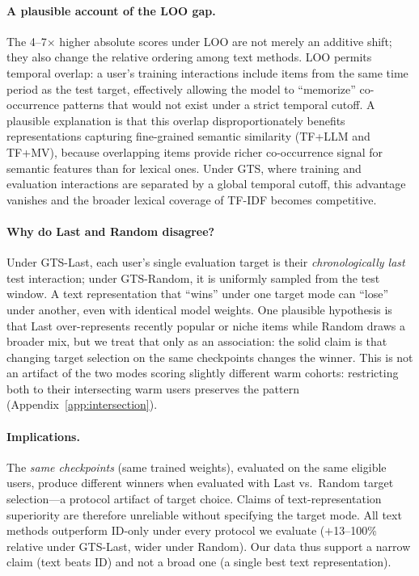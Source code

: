 \documentclass[sigconf,natbib=true,anonymous]{acmart}
\newcommand{\tfidf}{\textsc{TF-IDF}\xspace}
\newcommand{\tfllm}{\textsc{TF+LLM}\xspace}
\newcommand{\tfmv}{\textsc{TF+MV}\xspace}
\begin{document}
\paragraph{A plausible account of the LOO gap.}
The 4--7$\times$ higher absolute scores under LOO are not merely an additive shift; they also change the relative ordering among text methods.
LOO permits temporal overlap: a user's training interactions include items from the same time period as the test target, effectively allowing the model to ``memorize'' co-occurrence patterns that would not exist under a strict temporal cutoff.
A plausible explanation is that this overlap disproportionately benefits representations capturing fine-grained semantic similarity (\tfllm and \tfmv), because overlapping items provide richer co-occurrence signal for semantic features than for lexical ones.
Under GTS, where training and evaluation interactions are separated by a global temporal cutoff, this advantage vanishes and the broader lexical coverage of \tfidf becomes competitive.

\paragraph{Why do Last and Random disagree?}
Under GTS-Last, each user's single evaluation target is their \emph{chronologically last} test interaction; under GTS-Random, it is uniformly sampled from the test window.
A text representation that ``wins'' under one target mode can ``lose'' under another, even with identical model weights.
One plausible hypothesis is that Last over-represents recently popular or niche items while Random draws a broader mix, but we treat that only as an association: the solid claim is that changing target selection on the same checkpoints changes the winner.
This is not an artifact of the two modes scoring slightly different warm cohorts: restricting both to their intersecting warm users preserves the pattern (Appendix~\ref{app:intersection}).

\paragraph{Implications.}
The \emph{same checkpoints} (same trained weights), evaluated on the same eligible users, produce different winners when evaluated with Last vs.\ Random target selection---a protocol artifact of target choice.
Claims of text-representation superiority are therefore unreliable without specifying the target mode.
All text methods outperform ID-only under every protocol we evaluate ($+$13--100\% relative under GTS-Last, wider under Random).
Our data thus support a narrow claim (text beats ID) and not a broad one (a single best text representation).
\end{document}

